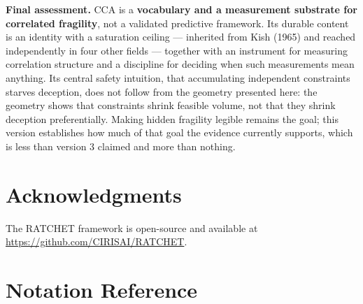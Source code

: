 \documentclass[11pt,a4paper]{article}
\theoremstyle{definition}
\theoremstyle{remark}
\begin{document}
\medskip
\noindent\textbf{Final assessment.} CCA is a \textbf{vocabulary and a measurement substrate for
correlated fragility}, not a validated predictive framework. Its durable content is an identity
with a saturation ceiling --- inherited from Kish (1965) and reached independently in four other
fields --- together with an instrument for measuring correlation structure and a discipline for
deciding when such measurements mean anything. Its central safety intuition, that accumulating
independent constraints starves deception, does not follow from the geometry presented here: the
geometry shows that constraints shrink feasible volume, not that they shrink deception
preferentially. Making hidden fragility legible remains the goal; this version establishes how
much of that goal the evidence currently supports, which is less than version 3 claimed and more
than nothing.

\section*{Acknowledgments}

The RATCHET framework is open-source and available at \url{https://github.com/CIRISAI/RATCHET}.

\appendix
\section{Notation Reference}
\end{document}

